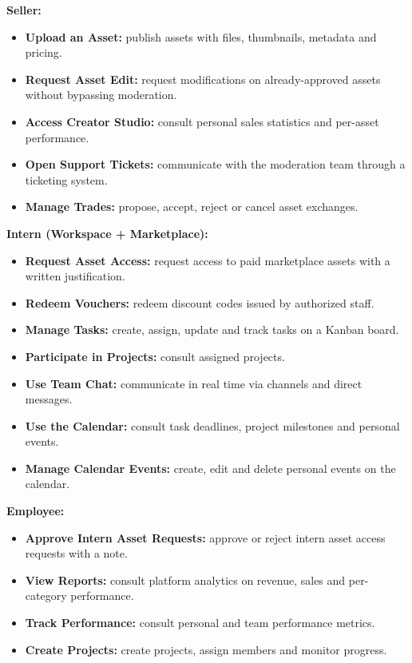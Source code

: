 \textbf{Seller:}

\begin{itemize}[label=---,leftmargin=2em]
  \item \textbf{Upload an Asset:} publish assets with files, thumbnails, metadata and pricing.
  \item \textbf{Request Asset Edit:} request modifications on already-approved assets without bypassing moderation.
  \item \textbf{Access Creator Studio:} consult personal sales statistics and per-asset performance.
  \item \textbf{Open Support Tickets:} communicate with the moderation team through a ticketing system.
  \item \textbf{Manage Trades:} propose, accept, reject or cancel asset exchanges.
\end{itemize}

\textbf{Intern (Workspace + Marketplace):}

\begin{itemize}[label=---,leftmargin=2em]
  \item \textbf{Request Asset Access:} request access to paid marketplace assets with a written justification.
  \item \textbf{Redeem Vouchers:} redeem discount codes issued by authorized staff.
  \item \textbf{Manage Tasks:} create, assign, update and track tasks on a Kanban board.
  \item \textbf{Participate in Projects:} consult assigned projects.
  \item \textbf{Use Team Chat:} communicate in real time via channels and direct messages.
  \item \textbf{Use the Calendar:} consult task deadlines, project milestones and personal events.
  \item \textbf{Manage Calendar Events:} create, edit and delete personal events on the calendar.
\end{itemize}

\textbf{Employee:}

\begin{itemize}[label=---,leftmargin=2em]
  \item \textbf{Approve Intern Asset Requests:} approve or reject intern asset access requests with a note.
  \item \textbf{View Reports:} consult platform analytics on revenue, sales and per-category performance.
  \item \textbf{Track Performance:} consult personal and team performance metrics.
  \item \textbf{Create Projects:} create projects, assign members and monitor progress.
\end{itemize}

